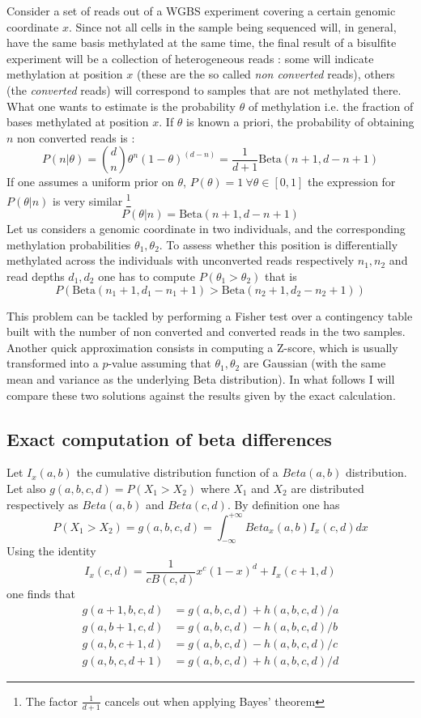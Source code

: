 \documentclass[11pt]{amsart}
\begin{document}
Consider a set of reads out of a WGBS experiment covering a certain genomic coordinate $x$. Since not all cells in the sample being sequenced will, in general,  have the same basis methylated at the same time, the final result of a bisulfite experiment will be a collection of heterogeneous reads : some will indicate methylation at position $x$ (these are the so called {\em non converted} reads), others (the {\em converted} reads) will correspond to samples that are not methylated there. What one wants to estimate is the probability $\theta$ of methylation i.e. the fraction of bases methylated at position $x$.  If $\theta$ is known a priori, the probability of obtaining $n$ non converted reads is :
\[P(n|\theta)={d \choose n}\theta^n ({1-\theta})^{(d-n)}=\frac{1}{d+1}\mbox{Beta}(n+1,d-n+1)\]
If one assumes a uniform prior on $\theta$, $P(\theta)=1 \ \forall \theta \in [0,1]$ the expression for $P(\theta|n)$ is very similar \footnote{The factor $\frac{1}{d+1}$ cancels out when applying Bayes' theorem}
\[P(\theta|n)=\mbox{Beta}(n+1,d-n+1)\]
Let us considers a genomic coordinate in two individuals, and the corresponding methylation probabilities $\theta_1,\theta_2$. 
To assess whether this position is differentially methylated across the individuals with unconverted reads respectively $n_1,n_2$ and read depths $d_1,d_2$ one
has to compute $P(\theta_1>\theta_2)$ that is \[P(\mbox{Beta}(n_1+1,d_1-n_1+1)>\mbox{Beta}(n_2+1,d_2-n_2+1))\]
 
This problem can be tackled by performing a Fisher test over a contingency table built with the number of non converted and converted reads in the two samples. Another quick approximation consists in computing a Z-score, which is usually transformed into a $p$-value assuming that $\theta_1,\theta_2$ are Gaussian (with the same mean and variance as the underlying Beta distribution). In what follows I will compare these two solutions against the results given by the exact calculation.
 
\subsection{Exact computation of beta differences}

Let $I_x(a,b)$ the cumulative distribution function of a $Beta(a,b)$ distribution. Let also $g(a,b,c,d)=P(X_1>X_2)$ where $X_1$ and $X_2$ are distributed respectively as $Beta(a,b)$ and $Beta(c,d)$. By definition one has \[P(X_1>X_2)=g(a,b,c,d)=\int_{-\infty}^{+\infty} Beta_x(a,b)I_x(c,d) dx\]
Using the identity \[I_x(c,d)=\frac{1}{cB(c,d)}x^c(1-x)^d+I_x(c+1,d)\] one finds that 
\begin{align}
g(a+1,b,c,d) &= g(a,b,c,d) + h(a,b,c,d)/a \\
g(a,b+1,c,d) &= g(a,b,c,d) - h(a,b,c,d)/b \\
g(a,b,c+1,d) &= g(a,b,c,d) - h(a,b,c,d)/c \\
g(a,b,c,d+1) &= g(a,b,c,d) + h(a,b,c,d)/d 
\end{align}
\end{document}
